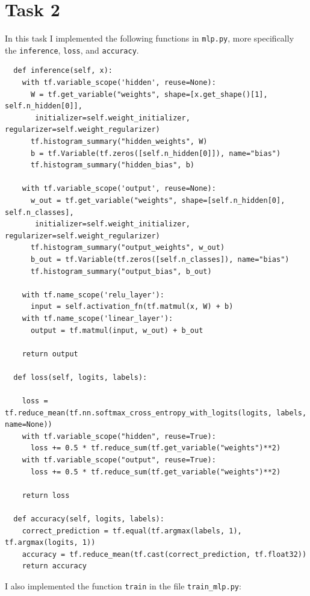 \documentclass{article}
\begin{document}
\section{Task 2}
In this task I implemented the following functions in \texttt{mlp.py}, more specifically the \texttt{inference}, \texttt{loss}, and \texttt{accuracy}.

\begin{small}
\begin{verbatim}
  def inference(self, x):
    with tf.variable_scope('hidden', reuse=None):
      W = tf.get_variable("weights", shape=[x.get_shape()[1], self.n_hidden[0]],
       initializer=self.weight_initializer, regularizer=self.weight_regularizer)
      tf.histogram_summary("hidden_weights", W)
      b = tf.Variable(tf.zeros([self.n_hidden[0]]), name="bias")
      tf.histogram_summary("hidden_bias", b)

    with tf.variable_scope('output', reuse=None):
      w_out = tf.get_variable("weights", shape=[self.n_hidden[0], self.n_classes],
       initializer=self.weight_initializer, regularizer=self.weight_regularizer)
      tf.histogram_summary("output_weights", w_out)
      b_out = tf.Variable(tf.zeros([self.n_classes]), name="bias")
      tf.histogram_summary("output_bias", b_out)

    with tf.name_scope('relu_layer'):
      input = self.activation_fn(tf.matmul(x, W) + b)
    with tf.name_scope('linear_layer'):
      output = tf.matmul(input, w_out) + b_out

    return output
    
  def loss(self, logits, labels):

    loss = tf.reduce_mean(tf.nn.softmax_cross_entropy_with_logits(logits, labels, name=None))
    with tf.variable_scope("hidden", reuse=True):
      loss += 0.5 * tf.reduce_sum(tf.get_variable("weights")**2)
    with tf.variable_scope("output", reuse=True):
      loss += 0.5 * tf.reduce_sum(tf.get_variable("weights")**2)

    return loss
    
  def accuracy(self, logits, labels):
    correct_prediction = tf.equal(tf.argmax(labels, 1), tf.argmax(logits, 1))
    accuracy = tf.reduce_mean(tf.cast(correct_prediction, tf.float32))
    return accuracy
\end{verbatim}
\end{small}
I also implemented the function \texttt{train} in the file \texttt{train\_mlp.py}:
\end{document}
